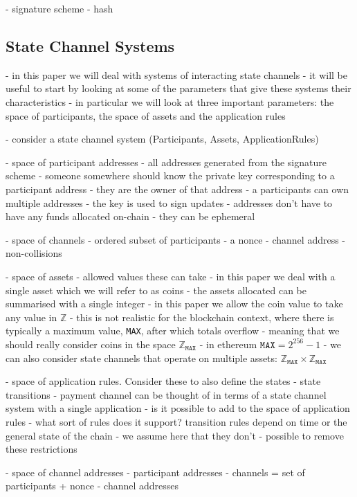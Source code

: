 \documentclass{article}
\theoremstyle{definition}
\begin{document}
- signature scheme
- hash

\subsection{State Channel Systems}

- in this paper we will deal with systems of interacting state channels
- it will be useful to start by looking at some of the parameters that give these
   systems their characteristics
- in particular we will look at three important parameters: the space of participants,
  the space of assets and the application rules

- consider a state channel system (Participants, Assets, ApplicationRules)

- space of participant addresses
- all addresses generated from the signature scheme
- someone somewhere should know the private key corresponding to a participant address
- they are the owner of that address
- a participants can own multiple addresses
- the key is used to sign updates
- addresses don't have to have any funds allocated on-chain - they can be ephemeral

- space of channels
- ordered subset of participants
- a nonce
- channel address
- non-collisions

- space of assets
- allowed values these can take
- in this paper we deal with a single asset which we will refer to as coins
- the assets allocated can be summarised with a single integer
- in this paper we allow the coin value to take any value in $\mathbb{Z}$
- this is not realistic for the blockchain context, where there is typically a maximum
  value, \texttt{MAX}, after which totals overflow
- meaning that we should really consider coins in the space $\mathbb{Z}_{\texttt{MAX}}$
- in ethereum $\texttt{MAX} = 2^{256} - 1$
- we can also consider state channels that operate on multiple assets: $\mathbb{Z}_{\texttt{MAX}} \times \mathbb{Z}_{\texttt{MAX}}$

- space of application rules. Consider these to also define the states
- state transitions
- payment channel can be thought of in terms of a state channel system with a single application
- is it possible to add to the space of application rules
- what sort of rules does it support? transition rules depend on time or the general state of the chain
- we assume here that they don't
- possible to remove these restrictions



- space of channel addresses
- participant addresses
- channels = set of participants + nonce
- channel addresses
\end{document}
